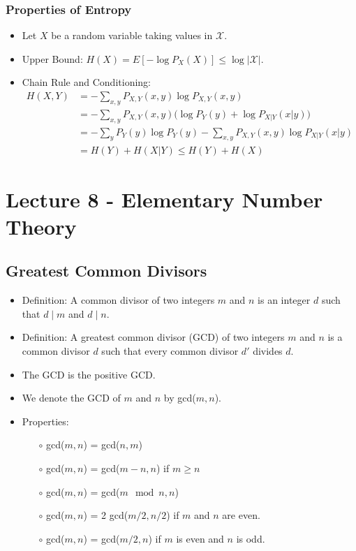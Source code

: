 \documentclass[a4paper]{scrartcl}
\begin{document}
\subsubsection*{Properties of Entropy}

\begin{itemize}
\item Let $X$ be a random variable taking values in $\mathcal{X}$.
\item Upper Bound: $H(X) = E[-\log P_X(X)] \leq \log |\mathcal{X}|$.
\item Chain Rule and Conditioning:
\begin{align*}
H(X,Y) &= -\sum_{x,y}P_{X,Y}(x,y) \log P_{X,Y}(x,y)\\
&= - \sum_{x,y}P_{X,Y}(x,y)\big(\log P_Y(y) + \log P_{X|Y} (x|y)\big)\\
&= - \sum_y P_Y(y)\log P_Y(y) - \sum_{x,y} P_{X,Y}(x,y) \log P_{X|Y}(x|y)\\
&= H(Y) + H(X|Y) \leq H(Y) + H(X)
\end{align*}
\end{itemize}

\section*{Lecture 8 - Elementary Number Theory}

\subsection*{Greatest Common Divisors}

\begin{itemize}
\item Definition: A common divisor of two integers $m$ and $n$ is an integer $d$ such that $d \mid m$ and $d \mid n$.
\item Definition: A greatest common divisor (GCD) of two integers $m$ and $n$ is a common divisor $d$ such that every common divisor $d'$ divides $d$.
\item The GCD is the positive GCD.
\item We denote the GCD of $m$ and $n$ by gcd($m,n$).
\item Properties:
\begin{itemize}
\item [$\circ$] gcd($m,n$) = gcd($n,m$)
\item [$\circ$] gcd($m,n$) = gcd($m-n,n$) if $m \geq n$
\item [$\circ$] gcd($m,n$) = gcd($m \mod n,n$)
\item [$\circ$] gcd($m,n$) = 2 gcd($m/2,n/2$) if $m$ and $n$ are even.
\item [$\circ$] gcd($m,n$) = gcd($m/2,n$) if $m$ is even and $n$ is odd.
\end{itemize}
\end{itemize}
\end{document}
